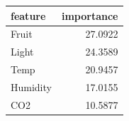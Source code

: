 \begin{tabular}{lr}
\toprule
feature & importance \\
\midrule
Fruit & 27.0922 \\
Light & 24.3589 \\
Temp & 20.9457 \\
Humidity & 17.0155 \\
CO2 & 10.5877 \\
\bottomrule
\end{tabular}
